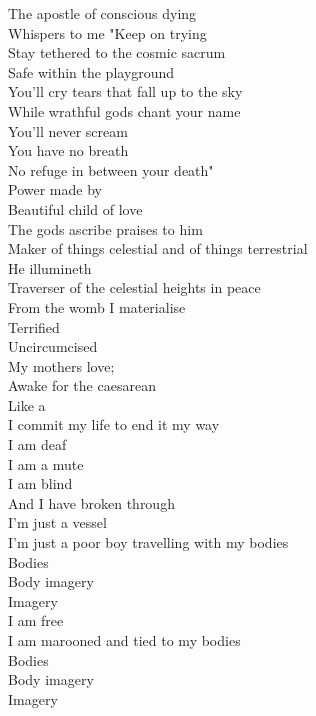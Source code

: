 

The apostle of conscious dying \\
Whispers to me "Keep on trying \\
Stay tethered to the cosmic sacrum \\
Safe within the  playground \\
You'll cry tears that fall up to the sky \\
While wrathful gods chant your name \\
You'll never scream \\
You have no breath \\
No refuge in between your death" \\

Power made by  \\
Beautiful child of love \\
The gods ascribe praises to him \\
Maker of things celestial and of things terrestrial \\
He illumineth  \\
Traverser of the celestial heights in peace \\

From the womb I materialise \\
Terrified \\
Uncircumcised \\
My mothers love;  \\
Awake for the caesarean \\
Like a  \\
I commit my life to end it my way \\
I am deaf \\
I am a mute \\
I am blind \\
And I have broken through \\

I'm just a vessel \\
I'm just a poor boy travelling with my bodies \\
Bodies \\
Body imagery \\
Imagery \\
I am free \\
I am marooned and tied to my bodies \\
Bodies \\
Body imagery \\
Imagery \\

